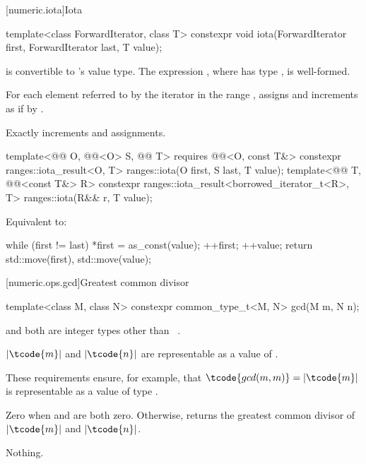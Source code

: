 [numeric.iota]{Iota}

%
\begin{itemdecl}
template<class ForwardIterator, class T>
  constexpr void iota(ForwardIterator first, ForwardIterator last, T value);
\end{itemdecl}

\begin{itemdescr}
\pnum
\mandates
{} is convertible to 's value type.
The expression , where  has type ,
is well-formed.

\pnum
\effects
For each element referred to by the iterator 
in the range ,
assigns  and increments 
as if by .

\pnum
\complexity
Exactly  increments and assignments.
\end{itemdescr}

%
\begin{itemdecl}
template<@@ O, @@<O> S, @@ T>
  requires @@<O, const T&>
  constexpr ranges::iota_result<O, T> ranges::iota(O first, S last, T value);
template<@@ T, @@<const T&> R>
  constexpr ranges::iota_result<borrowed_iterator_t<R>, T> ranges::iota(R&& r, T value);
\end{itemdecl}

\begin{itemdescr}
\pnum
\effects
Equivalent to:
\begin{codeblock}
while (first != last) {
  *first = as_const(value);
  ++first;
  ++value;
}
return {std::move(first), std::move(value)};
\end{codeblock}
\end{itemdescr}

[numeric.ops.gcd]{Greatest common divisor}

%
\begin{itemdecl}
template<class M, class N>
  constexpr common_type_t<M, N> gcd(M m, N n);
\end{itemdecl}

\begin{itemdescr}
\pnum
\mandates
{} and  both are integer types other than
\cv{}~.

\pnum
\expects
$|\tcode{m}|$ and $|\tcode{n}|$
are representable as a value of .
\begin{note}
These requirements ensure, for example,
that $\tcode{gcd(m, m)} = |\tcode{m}|$
is representable as a value of type .
\end{note}


\pnum
\returns
Zero when  and  are both zero. Otherwise,
returns the greatest common divisor of $|\tcode{m}|$ and $|\tcode{n}|$.

\pnum
\throws
Nothing.
\end{itemdescr}

